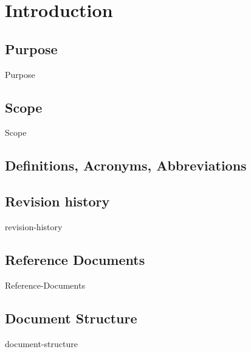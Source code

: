 \section{Introduction}

\subsection{Purpose}
{Purpose}

\subsection{Scope}
{Scope}

\subsection{Definitions, Acronyms, Abbreviations}
\printnoidxglossary
\printglossary

\printnoidxglossary[type=acronym]
\printacronyms


\subsection{Revision history}
{revision-history}

\subsection{Reference Documents}
{Reference-Documents}

\subsection{Document Structure}
{document-structure}
